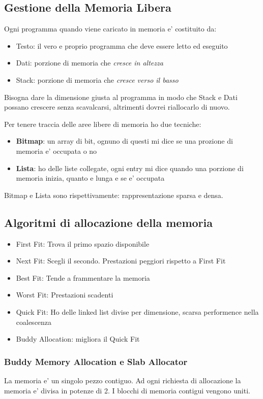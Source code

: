 \subsection{Gestione della Memoria Libera}
Ogni programma quando viene caricato in memoria e' costituito da:
\begin{itemize}
    \item Testo: il vero e proprio programma che deve essere letto ed eseguito
    \item Dati: porzione di memoria che \textit{cresce in altezza}
    \item Stack: porzione di memoria che \textit{cresce verso il basso}
\end{itemize} 

Bisogna dare la dimensione giusta al programma in modo che Stack e Dati possano crescere 
senza scavalcarsi, altrimenti dovrei riallocarlo di nuovo.

Per tenere traccia delle aree libere di memoria ho due tecniche:
\begin{itemize}
    \item \textbf{Bitmap}: un array di bit, ognuno di questi mi dice se una prozione di memoria e' occupata o no
    \item \textbf{Lista}: ho delle liste collegate, ogni entry mi dice quando una porzione di memoria inizia, quanto e lunga
    e se e' occupata
\end{itemize}

Bitmap e Lista sono rispettivamente: rappresentazione sparsa e densa.

\subsection{Algoritmi di allocazione della memoria}
\begin{itemize}
    \item First Fit: Trova il primo spazio disponibile
    \item Next Fit: Scegli il secondo. Prestazioni peggiori rispetto a First Fit
    \item Best Fit: Tende a frammentare la memoria
    \item Worst Fit: Prestazioni scadenti
    \item Quick Fit: Ho delle linked list divise per dimensione, scarsa performence nella coalescenza
    \item Buddy Allocation: migliora il Quick Fit
\end{itemize}

\subsubsection{Buddy Memory Allocation e Slab Allocator}
    La memoria e' un singolo pezzo contiguo. Ad ogni richiesta di allocazione la
    memoria e' divisa in potenze di 2.
    I blocchi di memoria contigui vengono uniti. \\

